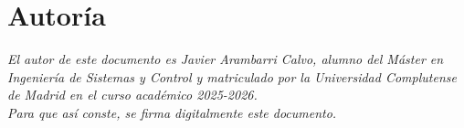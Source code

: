 \section*{Autoría}

\textit{El autor de este documento es Javier Arambarri Calvo, alumno del Máster en Ingeniería de Sistemas y Control y matriculado por la Universidad Complutense de Madrid en el curso académico 2025-2026.}\\

\textit{Para que así conste, se firma digitalmente este documento.}
